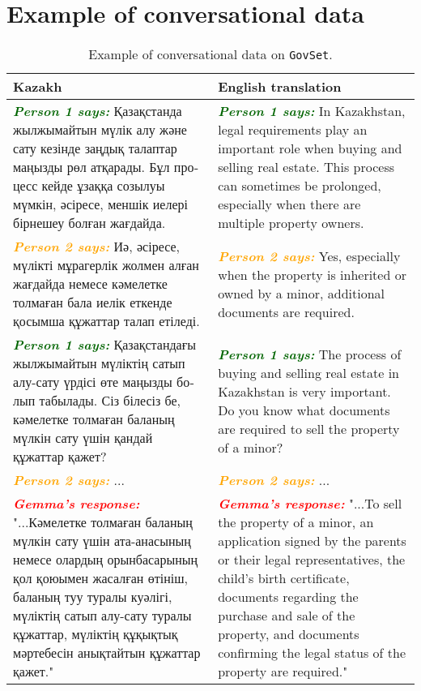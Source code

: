 \section{Example of conversational data}
\label{sec:conversational-data-sample}
\begin{table*}[ht]
\centering
\renewcommand{\arraystretch}{1.5} %
\scriptsize %
\begin{tabular}{p{6cm}|p{6cm}}  %
\hline
\textbf{Kazakh} & \textbf{English translation} \\ \hline
\textcolor{darkgreen}{\textbf{\textit{Person 1 says:}}} \foreignlanguage{russian}{Қазақстанда жылжымайтын мүлік алу және сату кезінде заңдық талаптар маңызды рөл атқарады. Бұл процесс кейде ұзаққа созылуы мүмкін, әсіресе, меншік иелері бірнешеу болған жағдайда.} 
& \textcolor{darkgreen}{\textbf{\textit{Person 1 says:}}} In Kazakhstan, legal requirements play an important role when buying and selling real estate. This process can sometimes be prolonged, especially when there are multiple property owners. \\[0.3cm]

\textcolor{orange}{\textbf{\textit{Person 2 says:}}} \foreignlanguage{russian}{Иә, әсіресе, мүлікті мұрагерлік жолмен алған жағдайда немесе кәмелетке толмаған бала иелік еткенде қосымша құжаттар талап етіледі.} 
& \textcolor{orange}{\textbf{\textit{Person 2 says:}}} Yes, especially when the property is inherited or owned by a minor, additional documents are required. \\[0.3cm]

\textcolor{darkgreen}{\textbf{\textit{Person 1 says:}}} \foreignlanguage{russian}{Қазақстандағы жылжымайтын мүліктің сатып алу-сату үрдісі өте маңызды болып табылады. Сіз білесіз бе, кәмелетке толмаған баланың мүлкін сату үшін қандай құжаттар қажет?} 
& \textcolor{darkgreen}{\textbf{\textit{Person 1 says:}}} The process of buying and selling real estate in Kazakhstan is very important. Do you know what documents are required to sell the property of a minor? \\[0.3cm]

\textcolor{orange}{\textbf{\textit{Person 2 says:}}} \foreignlanguage{russian}{...} 
& \textcolor{orange}{\textbf{\textit{Person 2 says:}}} ... \\[0.3cm]

\textcolor{red}{\textbf{\textit{Gemma's response:}}} \foreignlanguage{russian}{"...Кәмелетке толмаған баланың мүлкін сату үшін ата-анасының немесе олардың орынбасарының қол қоюымен жасалған өтініш, баланың туу туралы куәлігі, мүліктің сатып алу-сату туралы құжаттар, мүліктің құқықтық мәртебесін анықтайтын құжаттар қажет."}  
& \textcolor{red}{\textbf{\textit{Gemma's response:}}} "...To sell the property of a minor, an application signed by the parents or their legal representatives, the child's birth certificate, documents regarding the purchase and sale of the property, and documents confirming the legal status of the property are required." \\ 

\hline
\end{tabular}
\caption{Example of conversational data on \texttt{GovSet}.}
\label{tab:conversational-data-sample}
\end{table*}
